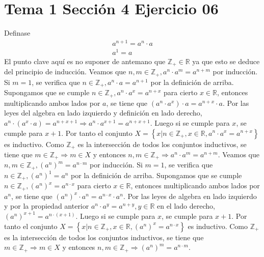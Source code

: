 \documentclass{article}
\begin{document}
\section{Tema 1 Sección 4 Ejercicio 06}
Definase 
\begin{eqnarray}
a^{n+1}= a^n \cdot a \\
a^{1}=a
\end{eqnarray}
El punto clave aquí es no suponer
de antemano que \(\mathbb{Z}_{+}\in \mathbb{R}\) ya que esto se deduce del principio de inducción.
Veamos que \(n,m\in \mathbb{Z}_{+}, a^n \cdot a^m =a^{n+m}\) por inducción. Si \(m=1\), se verifica que \(n\in \mathbb{Z}_{+}, a^n \cdot a =a^{n+1}\) por la definición de arriba. Supongamos que se cumple \(n\in \mathbb{Z}_{+}, a^n \cdot a^x =a^{n+x}\) para cierto \(x\in \mathbb{R}\), entonces multiplicando ambos lados por \(a\), se tiene que \(\left(a^n \cdot a^x \right)\cdot a= a^{n+x}\cdot a\). Por las leyes del algebra en lado izquierdo y definición en lado derecho, \(a^n \cdot \left( a^x \cdot a\right)= a^{n+x+1}\Rightarrow a^n \cdot  a^{x+1}= a^{n+x+1}\). Luego si se cumple para \(x\), se cumple para \(x+1\). Por tanto el conjunto \(X=\left\{x|n\in \mathbb{Z}_{+}, x\in \mathbb{R},a^n \cdot a^x = a^{n+x}\right\}\) es inductivo. Como \(\mathbb{Z}_{+}\) es la intersección de todos los conjuntos inductivos, se tiene que \(m \in \mathbb{Z}_{+}\Rightarrow m \in X\) y entonces \(n,m\in \mathbb{Z}_{+}\Rightarrow a^n \cdot a^m =a^{n+m}\).
\newline
Veamos que \(n,m\in \mathbb{Z}_{+},\left( a^n \right)^m =a^{n \cdot m}\) por inducción.
Si \(m=1\), se verifica que \(n\in \mathbb{Z}_{+}, \left(a^n \right)^1 =a^{n}\) por la definición de arriba. Supongamos que se cumple \(n\in \mathbb{Z}_{+},\left( a^n \right)^x =a^{n\cdot x}\) para cierto \(x\in \mathbb{R}\), entonces multiplicando ambos lados por \(a^n\), se tiene que \(\left(a^n \right)^{x}\cdot a^n= a^{n\cdot x}\cdot a^n\). Por las leyes de algebra en lado izquierdo y por la propiedad anterior \(a^n \cdot a^y= a^{n+y}, y\in\mathbb{R}\) en el lado derecho, \(\left(a^n\right)^{x+1} =a^{n \cdot \left(x+1\right)}\). Luego si se cumple para \(x\), se cumple para \(x+1\). Por tanto el conjunto \(X=\left\{x|n\in \mathbb{Z}_{+}, x\in \mathbb{R},\left(a^n\right)^{x} =a^{n \cdot x}\right\}\) es inductivo. Como \(\mathbb{Z}_{+}\) es la intersección de todos los conjuntos inductivos, se tiene que \(m \in \mathbb{Z}_{+}\Rightarrow m \in X\) y entonces \(n,m\in \mathbb{Z}_{+}\Rightarrow \left(a^n\right)^{m} =a^{n \cdot m}\).
\end{document}
